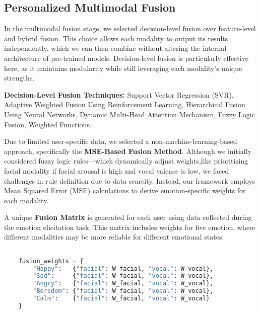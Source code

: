 \subsection{Personalized Multimodal Fusion}
\label{sec:exp-phase2-fusion}

\par In the multimodal fusion stage, we selected decision-level fusion over feature-level and hybrid fusion. This choice allows each modality to output its results independently, which we can then combine without altering the internal architecture of pre-trained models. Decision-level fusion is particularly effective here, as it maintains modularity while still leveraging each modality’s unique strengths.

\textbf{Decision-Level Fusion Techniques:} 
Support Vector Regression (SVR), Adaptive Weighted Fusion Using Reinforcement Learning, Hierarchical Fusion Using Neural Networks, Dynamic Multi-Head Attention Mechanism, Fuzzy Logic Fusion, Weighted Functions.

\par Due to limited user-specific data, we selected a non-machine-learning-based approach, specifically the \textbf{MSE-Based Fusion Method}. Although we initially considered fuzzy logic rules—which dynamically adjust weights,like prioritizing facial modality if facial arousal is high and vocal valence is low, we faced challenges in rule definition due to data scarcity. Instead, our framework employs Mean Squared Error (MSE) calculations to derive emotion-specific weights for each modality.

\par A unique \textbf{Fusion Matrix} is generated for each user using data collected during the emotion elicitation task. This matrix includes weights for five emotion, where different modalities may be more reliable for different emotional states:

\begin{lstlisting}[language=Python, caption=Emotion-specific fusion weights per user, basicstyle=\ttfamily\small, label=lst:weights]

    fusion_weights = {
        "Happy":   {"facial": W_facial, "vocal": W_vocal},
        "Sad":     {"facial": W_facial, "vocal": W_vocal},
        "Angry":   {"facial": W_facial, "vocal": W_vocal},
        "Boredom": {"facial": W_facial, "vocal": W_vocal},
        "Calm":    {"facial": W_facial, "vocal": W_vocal}
    }
\end{lstlisting}


